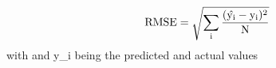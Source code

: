 $$\rm{RMSE}=\sqrt{\sum\limits_{i}\frac{(\hat{y_i}-y_i)^2}{N}}$$
with  and y_i being the predicted and actual values
